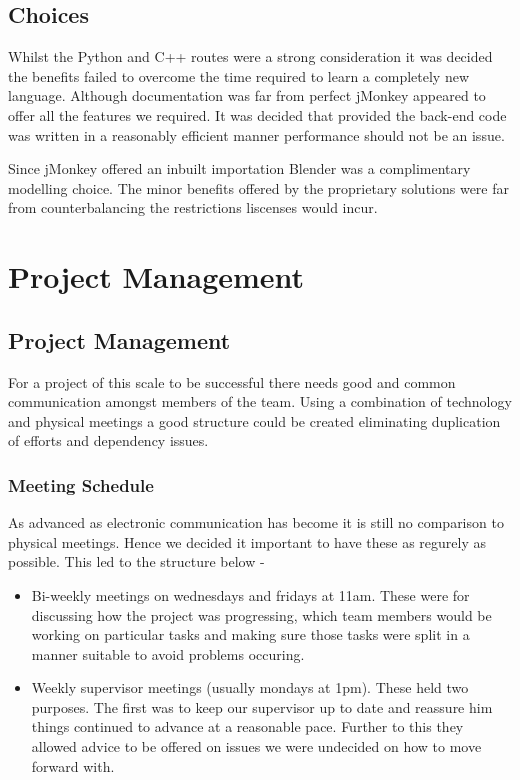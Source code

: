 \subsection*{Choices}

Whilst the Python and C++ routes were a strong consideration it was
decided the benefits failed to overcome the time required to learn
a completely new language. Although documentation was far from perfect
jMonkey appeared to offer all the features we required. It was decided
that provided the back-end code was written in a reasonably efficient
manner performance should not be an issue.

Since jMonkey offered an inbuilt importation Blender was a complimentary
modelling choice. The minor benefits offered by the proprietary solutions
were far from counterbalancing the restrictions liscenses would incur.


\section*{Project Management}


\subsection*{Project Management}

For a project of this scale to be successful there needs good and
common communication amongst members of the team. Using a combination
of technology and physical meetings a good structure could be created
eliminating duplication of efforts and dependency issues.


\subsubsection*{Meeting Schedule}

As advanced as electronic communication has become it is still no
comparison to physical meetings. Hence we decided it important to
have these as regurely as possible. This led to the structure below
-
\begin{itemize}
\item Bi-weekly meetings on wednesdays and fridays at 11am. These were for
discussing how the project was progressing, which team members would
be working on particular tasks and making sure those tasks were split
in a manner suitable to avoid problems occuring.
\item Weekly supervisor meetings (usually mondays at 1pm). These held two
purposes. The first was to keep our supervisor up to date and reassure
him things continued to advance at a reasonable pace. Further to this
they allowed advice to be offered on issues we were undecided on how
to move forward with.
\end{itemize}

